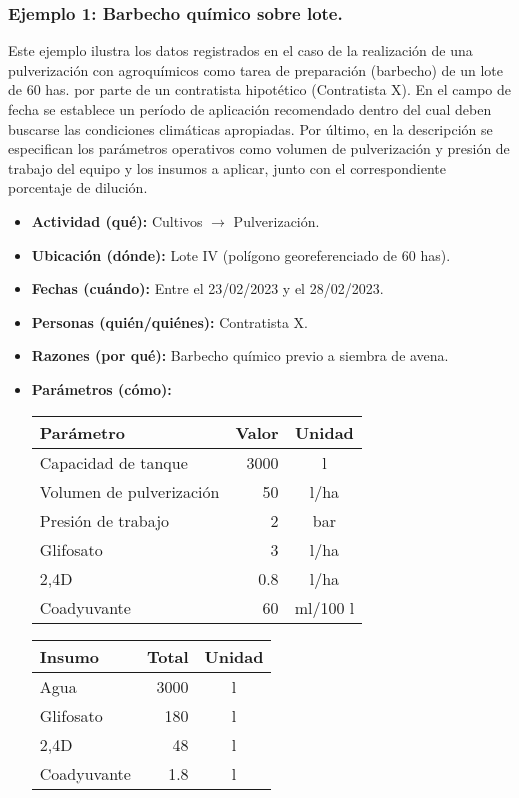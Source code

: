 \subsubsection{Ejemplo 1: Barbecho químico sobre lote.} Este ejemplo ilustra los datos registrados en el caso de la realización de una pulverización con agroquímicos como tarea de preparación (barbecho) de un lote de 60 has. por parte de un contratista hipotético (Contratista X). En el campo de fecha se establece un período de aplicación recomendado dentro del cual deben buscarse las condiciones climáticas apropiadas. Por último, en la descripción se especifican los parámetros operativos como volumen de pulverización y presión de trabajo del equipo y los insumos a aplicar, junto con el correspondiente porcentaje de dilución.
\begin{itemize}
    \item \textbf{Actividad (qué):} Cultivos $\rightarrow$ Pulverización.
    \item \textbf{Ubicación (dónde):} Lote IV (polígono georeferenciado de 60 has). 
    \item \textbf{Fechas (cuándo):} Entre el 23/02/2023 y el 28/02/2023.
    \item \textbf{Personas (quién/quiénes):} Contratista X. 
    \item \textbf{Razones (por qué):} Barbecho químico previo a siembra de avena. 
    \item \textbf{Parámetros (cómo):} 
    
    \begin{center}
        \begin{tabular}{ |l|r|c| } 
            \hline
            \textbf{Parámetro} & \textbf{Valor} & \textbf{Unidad} \\ 
            \hline
            Capacidad de tanque & 3000 & l \\ 
            Volumen de pulverización & 50 & l/ha \\ 
            Presión de trabajo & 2 & bar \\ 
            Glifosato & 3 & l/ha \\ 
            2,4D & 0.8 & l/ha \\ 
            Coadyuvante & 60 & ml/100 l \\ 
            \hline
        \end{tabular}
        \quad
        \begin{tabular}{ |l|r|c| } 
            \hline
            \textbf{Insumo} & \textbf{Total} & \textbf{Unidad} \\ 
            \hline
            Agua & 3000 & l \\ 
            Glifosato & 180 & l \\ 
            2,4D & 48 & l \\ 
            Coadyuvante & 1.8 & l \\ 
            \hline
        \end{tabular}
    \end{center}
\end{itemize}

